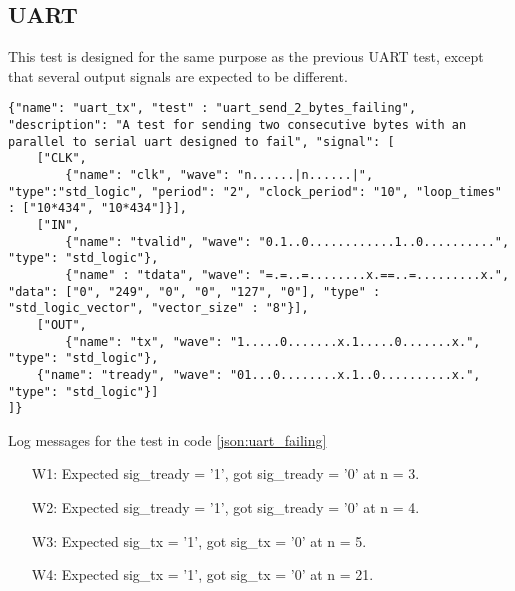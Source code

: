 \subsection{UART}
This test is designed for the same purpose as the previous UART test, except that several output signals are expected to be different.
\begin{lstlisting}[style=json, caption={Failing functionality test for the UART design in appendix \ref{appendix:uart}}, label={json:uart_failing}]
{"name": "uart_tx", "test" : "uart_send_2_bytes_failing", "description": "A test for sending two consecutive bytes with an parallel to serial uart designed to fail", "signal": [
	["CLK",
		{"name": "clk", "wave": "n......|n......|", "type":"std_logic", "period": "2", "clock_period": "10", "loop_times" : ["10*434", "10*434"]}],
	["IN",
		{"name": "tvalid", "wave": "0.1..0............1..0..........", "type": "std_logic"},
		{"name" : "tdata", "wave": "=.=..=........x.==..=.........x.", "data": ["0", "249", "0", "0", "127", "0"], "type" : "std_logic_vector", "vector_size" : "8"}],
	["OUT",
		{"name": "tx", "wave": "1.....0.......x.1.....0.......x.", "type": "std_logic"},
	{"name": "tready", "wave": "01...0........x.1..0..........x.", "type": "std_logic"}]
]}
\end{lstlisting}
\begin{customenv}
	\caption{Log messages for the test in code \ref{json:uart_failing}}
	\begin{itemize}
		\item [W1:] Expected sig\_tready =  '1',  got sig\_tready =  '0' at n = 3.
		\item [W2:] Expected sig\_tready =  '1',  got sig\_tready =  '0' at n = 4.
		\item [W3:] Expected sig\_tx =  '1',  got sig\_tx =  '0' at n = 5.
		\item [W4:] Expected sig\_tx =  '1',  got sig\_tx =  '0' at n = 21.
	\end{itemize}
\end{customenv}\clearpage\noindent
